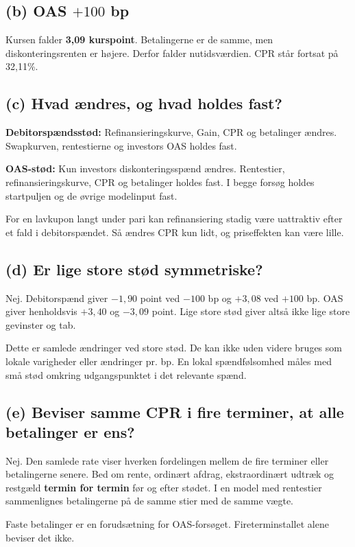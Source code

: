 \documentclass[11pt,a4paper]{article}
\newcommand{\del}[1]{\subsection*{#1}}
\begin{document}
\del{(b) OAS $+100$ bp}
Kursen falder \textbf{3,09 kurspoint}. Betalingerne er de samme, men diskonteringsrenten er højere. Derfor falder nutidsværdien. CPR står fortsat på 32,11\%.

\del{(c) Hvad ændres, og hvad holdes fast?}
\textbf{Debitorspændsstød:} Refinansieringskurve, Gain, CPR og betalinger ændres. Swapkurven, rentestierne og investors OAS holdes fast.

\textbf{OAS-stød:} Kun investors diskonteringsspænd ændres. Rentestier, refinansieringskurve, CPR og betalinger holdes fast. I begge forsøg holdes startpuljen og de øvrige modelinput fast.

For en lavkupon langt under pari kan refinansiering stadig være uattraktiv efter et fald i debitorspændet. Så ændres CPR kun lidt, og priseffekten kan være lille.

\del{(d) Er lige store stød symmetriske?}
Nej. Debitorspænd giver $-1{,}90$ point ved $-100$ bp og $+3{,}08$ ved $+100$ bp. OAS giver henholdsvis $+3{,}40$ og $-3{,}09$ point. Lige store stød giver altså ikke lige store gevinster og tab.

Dette er samlede ændringer ved store stød. De kan ikke uden videre bruges som lokale varigheder eller ændringer pr. bp. En lokal spændfølsomhed måles med små stød omkring udgangspunktet i det relevante spænd.

\del{(e) Beviser samme CPR i fire terminer, at alle betalinger er ens?}
Nej. Den samlede rate viser hverken fordelingen mellem de fire terminer eller betalingerne senere. Bed om rente, ordinært afdrag, ekstraordinært udtræk og restgæld \textbf{termin for termin} før og efter stødet. I en model med rentestier sammenlignes betalingerne på de samme stier med de samme vægte.

Faste betalinger er en forudsætning for OAS-forsøget. Fireterminstallet alene beviser det ikke.
\end{document}
